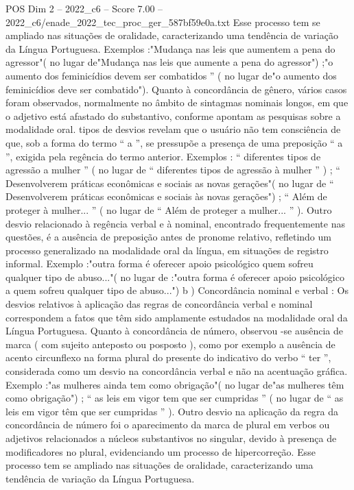 \begin{textsample}{POS Dim 2 – 2022\_c6 – Score 7.00 – 2022\_c6/enade\_2022\_tec\_proc\_ger\_587bf59e0a.txt}
Esse processo tem se ampliado nas situações de oralidade, caracterizando uma tendência de variação da Língua Portuguesa.
Exemplos :"Mudança nas leis que aumentem a pena do agressor"( no lugar de"Mudança nas leis que aumente a pena do agressor") ;"o aumento dos feminicídios devem ser combatidos ” ( no lugar de"o aumento dos feminicídios deve ser combatido").
Quanto à concordância de gênero, vários casos foram observados, normalmente no âmbito de sintagmas nominais longos, em que o adjetivo está afastado do substantivo, conforme apontam as pesquisas sobre a modalidade oral. tipos de desvios revelam que o usuário não tem consciência de que, sob a forma do termo “ a ”, se pressupõe a presença de uma preposição “ a ”, exigida pela regência do termo anterior.
Exemplos : “ diferentes tipos de agressão a mulher ” ( no lugar de “ diferentes tipos de agressão à mulher ” ) ; “ Desenvolverem práticas econômicas e sociais as novas gerações"( no lugar de “ Desenvolverem práticas econômicas e sociais às novas gerações") ; “ Além de proteger à mulher... ” ( no lugar de “ Além de proteger a mulher... ” ).
Outro desvio relacionado à regência verbal e à nominal, encontrado frequentemente nas questões, é a ausência de preposição antes de pronome relativo, refletindo um processo generalizado na modalidade oral da língua, em situações de registro informal.
Exemplo :"outra forma é oferecer apoio psicológico quem sofreu qualquer tipo de abuso..."( no lugar de :"outra forma é oferecer apoio psicológico a quem sofreu qualquer tipo de abuso...") b ) Concordância nominal e verbal : Os desvios relativos à aplicação das regras de concordância verbal e nominal correspondem a fatos que têm sido amplamente estudados na modalidade oral da Língua Portuguesa.
Quanto à concordância de número, observou -se ausência de marca ( com sujeito anteposto ou posposto ), como por exemplo a ausência de acento circunflexo na forma plural do presente do indicativo do verbo “ ter ”, considerada como um desvio na concordância verbal e não na acentuação gráfica.
Exemplo :"as mulheres ainda tem como obrigação"( no lugar de"as mulheres têm como obrigação") ; “ as leis em vigor tem que ser cumpridas ” ( no lugar de “ as leis em vigor têm que ser cumpridas ” ).
Outro desvio na aplicação da regra da concordância de número foi o aparecimento da marca de plural em verbos ou adjetivos relacionados a núcleos substantivos no singular, devido à presença de modificadores no plural, evidenciando um processo de hipercorreção.
Esse processo tem se ampliado nas situações de oralidade, caracterizando uma tendência de variação da Língua Portuguesa.

\end{textsample}
